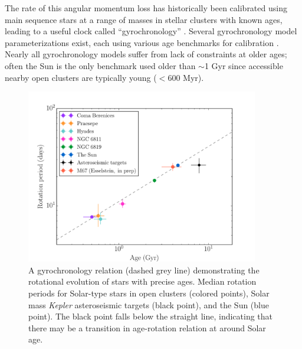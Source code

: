 \documentclass[12pt]{article}
\newcommand{\Kepler}{\textsl{Kepler}\xspace}
\newcommand{\eg}{{\it e.g.}}
\begin{document}
The rate of this angular momentum loss has historically been calibrated using
main sequence stars at a range of masses in stellar clusters with known ages,
leading to a useful clock called ``gyrochronology'' \citep{barnes2003}.
Several gyrochronology model parameterizations exist, each using various age
benchmarks for calibration \citep[\eg][]{barnes2007, barnes2010, mamajek2008,angus2015, Matt2012, van-saders2013, van-saders2016}.
Nearly all gyrochronology models suffer from lack of constraints at older
ages; often the Sun is the only benchmark used older than $\sim$1 Gyr since
accessible nearby open clusters are typically young ($<600$ Myr).

\begin{figure}[!t]
\centering
\includegraphics[width=4in]{AAS_talk_M67_astero.pdf}
    \caption{A gyrochronology relation (dashed grey line) demonstrating the
    rotational evolution of stars with precise ages.
    Median rotation periods for Solar-type stars in open clusters (colored points), Solar mass \Kepler asteroseismic targets (black point), and the Sun (blue point).
    The black point falls below the straight line, indicating that there may
    be a transition in age-rotation relation at around Solar age.}
\label{fig:gyro}
\end{figure}
\end{document}
